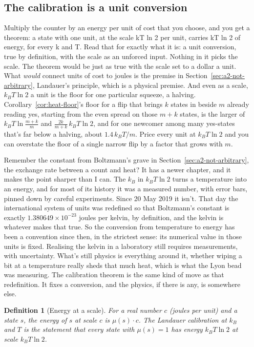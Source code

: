\documentclass[11pt,twoside]{article}
\theoremstyle{thielethm}
\theoremstyle{thieledef}
\newtheorem{definition}{Definition}[section]
\theoremstyle{thieledef}
\theoremstyle{thieledef}
\theoremstyle{thielethm}
\theoremstyle{thieleobs}
\theoremstyle{thielethm}
\begin{document}
\subsection{The calibration is a unit conversion}

Multiply the counter by an energy per unit of cost that you choose,
and you get a theorem: a state with one unit, at the scale kT ln 2 per unit, carries kT ln 2 of
energy, for every k and T. Read that for exactly what it is: a unit conversion, true by definition,
with the scale as an unforced input. Nothing in it picks the scale. The theorem would be just as
true with the scale set to a dollar a unit. What \emph{would} connect units of cost to joules is the premise in Section~\ref{sec:a2-not-arbitrary},
Landauer's principle, which is a physical premise. And even
as a scale, $k_B T \ln 2$ a unit is the floor for one particular squeeze, a halving.
Corollary~\ref{cor:heat-floor}'s floor for a flip that brings $k$ states in beside $m$ already
reading yes, starting
from the even spread on those $m+k$ states, is the larger of $k_B T \ln \frac{m+k}{m}$ and $\frac{2k}{m+k}\,k_B T\ln 2$, and for one newcomer among many yes-states that's far below a halving, about $1.4\,k_B T / m$. Price every unit at $k_B T \ln 2$ and you can overstate the floor
of a single narrow flip by a factor that grows with $m$.

Remember the constant from Boltzmann's grave in Section~\ref{sec:a2-not-arbitrary}, the exchange rate between a count and
heat? It has a newer chapter, and it makes the point sharper than I can. The $k_B$ in
$k_B T \ln 2$ turns a temperature into an energy, and for most of its
history it was a measured number, with error bars, pinned down by careful experiments. Since
20 May 2019 it isn't. That day the international system of units was redefined so that
Boltzmann's constant is exactly $1.380649 \times 10^{-23}$ joules per kelvin, by definition, and
the kelvin is whatever makes that true. So the conversion from temperature to energy has been a
convention since then, in the strictest sense: its numerical value in those units is fixed. Realising the kelvin in a laboratory still
requires measurements, with uncertainty. What's still
physics is everything around it, whether wiping a bit at a temperature really sheds that much
heat, which is what the Lyon bead was measuring. The calibration theorem is the same kind of move
as that redefinition. It fixes a conversion, and the physics, if there is any, is somewhere else.

\begin{definition}[Energy at a scale]\label{def:u24-scale}
For a real number $c$ (joules per unit) and a state $s$, the energy of $s$ at scale $c$ is
$\mu(s) \cdot c$. The \emph{Landauer calibration} at $k_B$ and $T$ is the statement that every
state with $\mu(s) = 1$ has energy $k_B T \ln 2$ at scale $k_B T \ln 2$.
\end{definition}
\end{document}
